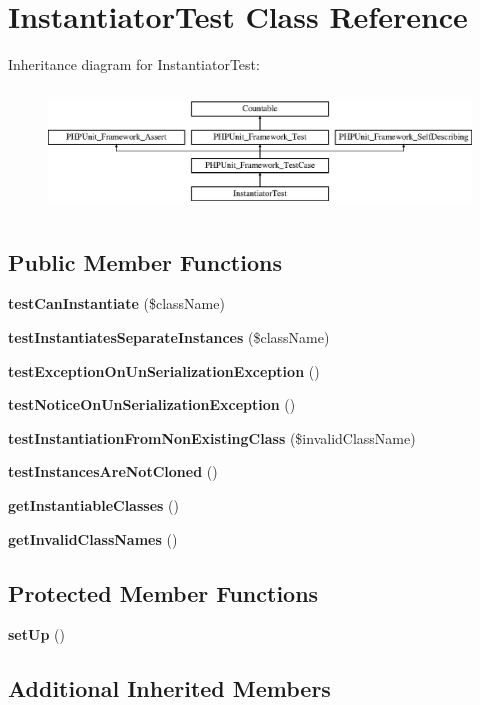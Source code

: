\section{Instantiator\+Test Class Reference}
\label{class_doctrine_test_1_1_instantiator_test_1_1_instantiator_test}
Inheritance diagram for Instantiator\+Test\+:\begin{figure}[H]
\begin{center}
\leavevmode
\includegraphics[height=3.303835cm]{class_doctrine_test_1_1_instantiator_test_1_1_instantiator_test}
\end{center}
\end{figure}
\subsection*{Public Member Functions}
\begin{DoxyCompactItemize}
\item 
{\bf test\+Can\+Instantiate} (\$class\+Name)
\item 
{\bf test\+Instantiates\+Separate\+Instances} (\$class\+Name)
\item 
{\bf test\+Exception\+On\+Un\+Serialization\+Exception} ()
\item 
{\bf test\+Notice\+On\+Un\+Serialization\+Exception} ()
\item 
{\bf test\+Instantiation\+From\+Non\+Existing\+Class} (\$invalid\+Class\+Name)
\item 
{\bf test\+Instances\+Are\+Not\+Cloned} ()
\item 
{\bf get\+Instantiable\+Classes} ()
\item 
{\bf get\+Invalid\+Class\+Names} ()
\end{DoxyCompactItemize}
\subsection*{Protected Member Functions}
\begin{DoxyCompactItemize}
\item 
{\bf set\+Up} ()
\end{DoxyCompactItemize}
\subsection*{Additional Inherited Members}


